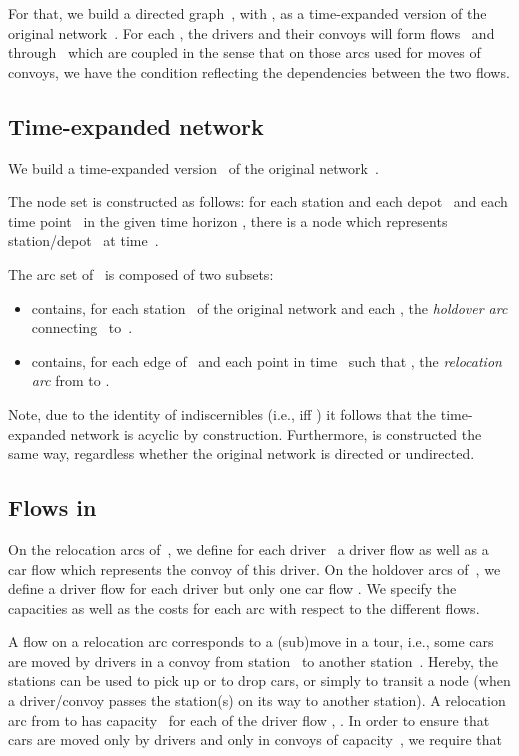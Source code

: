 \documentclass[english]{llncs}
\numberwithin{sublemma}{lemma}
\begin{document}
For that, we build a directed graph~, with , as a time-expanded version of the original network~. 
For each , the drivers and their convoys will form flows~ and  through~ which are coupled in the sense that on those arcs  used for moves of convoys,
we have the condition  reflecting the dependencies between the two flows.


\subsection{Time-expanded network \texorpdfstring{}{GT}}
\label{sec: static: min-cost flows: ten: wo pre w back}


We build a time-expanded version~ of the original network~.

The node set  is constructed as follows: 
for each station and each depot~ and each time point~ in the given time horizon , there is a node  which represents station/depot~ at time~.

The arc set  of~ is composed of two subsets:
\begin{itemize}
\item  contains, for each station~ of the original network and each , the \emph{holdover arc} connecting~ to~. 
\item  contains, for each edge  of~ and each point in time~ such that , the \emph{relocation arc} from  to .
\end{itemize}
Note, due to the identity of indiscernibles (i.e.,  iff ) it follows that the time-expanded network  is acyclic by construction.
Furthermore,  is constructed the same way, regardless whether the original network is directed or undirected.


\subsection{Flows in \texorpdfstring{}{GT}}
\label{sec: static: min-cost flows: flows: wo pre w back}


On the relocation arcs of~, we define for each driver~ a driver flow  as well as a car flow  which represents the convoy of this driver.
On the holdover arcs of~, we define a driver flow  for each driver but only one car flow .
We specify the capacities as well as the costs for each arc with respect to the different flows.


A flow on a relocation arc corresponds to a (sub)move in a tour, i.e., some cars are moved by drivers in a convoy from station~ to another station~.
Hereby, the stations can be used to pick up or to drop cars, or simply to transit a node (when a driver/convoy passes the station(s) on its way to another station).
A relocation arc from  to  has capacity~ for each of the driver flow , .
In order to ensure that cars are moved only by drivers and only in convoys of capacity~, we require that 
\end{document}
